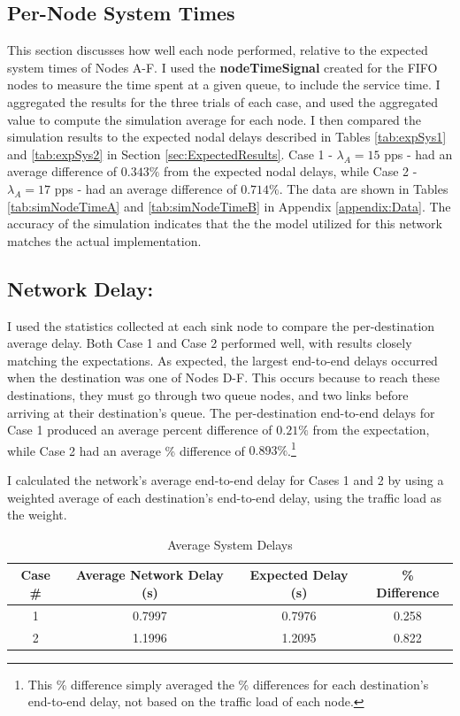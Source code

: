 \documentclass{article}
\begin{document}
\subsection{Per-Node System Times}
\label{subsec:systemTimes}
This section discusses how well each node performed, relative to the expected system times of Nodes A-F.
I used the \textbf{nodeTimeSignal} created for the FIFO nodes to measure the time spent at a given queue, to include the service time.
I aggregated the results for the three trials of each case, and used the aggregated value to compute the simulation average for each node.
I then compared the simulation results to the expected nodal delays described in Tables \ref{tab:expSys1} and \ref{tab:expSys2} in Section \ref{sec:ExpectedResults}.
Case 1 - $\lambda_A = 15$ pps - had an average difference of $0.343 \%$ from the expected nodal delays, while Case 2 - $\lambda_A = 17$ pps - had an average difference of $0.714\%$.
The data are shown in Tables \ref{tab:simNodeTimeA} and \ref{tab:simNodeTimeB} in Appendix \ref{appendix:Data}.
The accuracy of the simulation indicates that the the model utilized for this network matches the actual implementation.


\subsection{Network Delay:}
\label{subsec:NetworkDelay}
I used the statistics collected at each sink node to compare the per-destination average delay.
Both Case 1 and Case 2 performed well, with results closely matching the expectations.  
As expected, the largest end-to-end delays occurred when the destination was one of Nodes D-F. 
This occurs because to reach these destinations, they must go through two queue nodes, and two links before arriving at their destination's queue.
The per-destination end-to-end delays for Case 1 produced an average percent difference of $0.21\%$ from the expectation, while Case 2 had an average \% difference of $0.893\%$.\footnote{This \% difference simply averaged the \% differences for each destination's end-to-end delay, not based on the traffic load of each node.}

I calculated the network's average end-to-end delay for Cases 1 and 2 by using a weighted average of each destination's end-to-end delay, using the traffic load as the weight.

\begin{table}[h!]
\centering
\begin{tabular}{|c|c|c|c|} \hline
\textbf{Case \#} & \textbf{Average Network Delay (s)} & \textbf{Expected Delay (s)} & \textbf{\% Difference} \\ \hline
1 & 0.7997 & 0.7976 & 0.258 \\ \hline
2 & 1.1996 & 1.2095 & 0.822 \\ \hline
\end{tabular}
\caption{Average System Delays}
\label{tab:lifetime}
\end{table}
\end{document}
